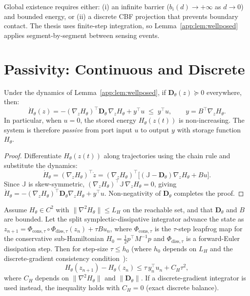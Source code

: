 \begin{remark}
Global existence requires either: (i) an infinite barrier
($b_i(d)\to+\infty$ as $d\to 0$) and bounded energy, or (ii) a
discrete CBF projection that prevents boundary contact.
The thesis uses finite-step integration, so Lemma~\ref{app:lem:wellposed}
applies segment-by-segment between sensing events.
\end{remark}

\section{Passivity: Continuous and Discrete}
\label{app:pass}

\begin{theorem}
\label{thm:passivity_cont}
Under the dynamics of Lemma~\ref{app:lem:wellposed}, if
$\mathbf{D}_\theta(z)\succeq 0$ everywhere, then:
\[
  \dot{H}_\theta(z)
  = -(\nabla_z H_\theta)^\top \mathbf{D}_\theta\,\nabla_z H_\theta
    + y^\top u
  \;\leq\; y^\top u,
  \qquad
  y = B^\top\nabla_z H_\theta.
\]
In particular, when $u=0$, the stored energy $H_\theta(z(t))$ is
non-increasing.
The system is therefore \emph{passive} from port input $u$ to
output $y$ with storage function $H_\theta$.
\end{theorem}

\begin{proof}
Differentiate $H_\theta(z(t))$ along trajectories using the
chain rule and substitute the dynamics:
\[
  \dot H_\theta
  = (\nabla_z H_\theta)^\top \dot z
  = (\nabla_z H_\theta)^\top
    \bigl[(\mathbb{J}-\mathbf{D}_\theta)\nabla_z H_\theta + Bu\bigr].
\]
Since $\mathbb{J}$ is skew-symmetric,
$(\nabla_z H_\theta)^\top \mathbb{J}\,\nabla_z H_\theta = 0$,
giving $\dot H_\theta
= -(\nabla_z H_\theta)^\top\mathbf{D}_\theta\nabla_z H_\theta
+ y^\top u$.
Non-negativity of $\mathbf{D}_\theta$ completes the proof.
\end{proof}

\begin{theorem}
\label{thm:passivity_disc}
Assume $H_\theta \in C^2$ with $\|\nabla^2 H_\theta\|\leq L_H$ on the
reachable set, and that $\mathbf{D}_\theta$ and $B$ are bounded.
Let the split symplectic-dissipative integrator advance the state as
$z_{n+1} = \Phi_{\mathrm{cons},\tau}\circ\Phi_{\mathrm{diss},\tau}(z_n)
+ \tau Bu_n$,
where $\Phi_{\mathrm{cons},\tau}$ is the $\tau$-step leapfrog map
for the conservative sub-Hamiltonian $H_0 = \frac{1}{2}p^\top M^{-1}p$
and $\Phi_{\mathrm{diss},\tau}$ is a forward-Euler dissipation step.
Then for step-size $\tau\leq h_0$ (where $h_0$ depends on $L_H$
and the discrete-gradient consistency condition~\citep{hairer2006geometric}):
\[
  H_\theta(z_{n+1}) - H_\theta(z_n)
  \leq \tau\, y_n^\top u_n + C_H\tau^2,
\]
where $C_H$ depends on $\|\nabla^2 H_\theta\|$ and $\|\mathbf{D}_\theta\|$.
If a discrete-gradient integrator is used instead, the inequality
holds with $C_H = 0$ (exact discrete balance).
\end{theorem}

